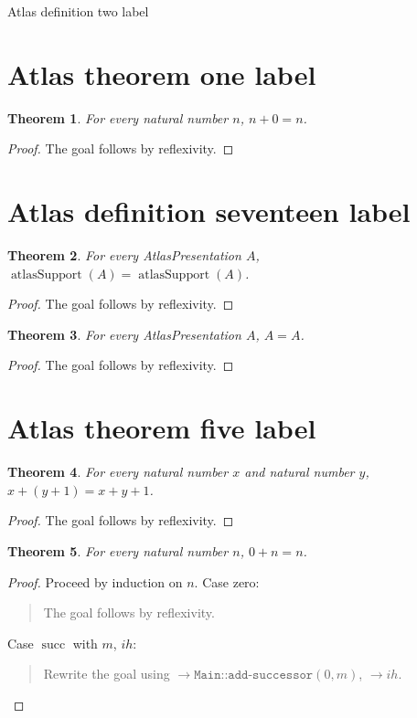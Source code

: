 \documentclass[11pt]{article}
\newtheorem{theorem}{Theorem}[section]
\theoremstyle{definition}
\begin{document}
\begin{center}
{\LARGE Atlas definition two label}
\end{center}
\section{Atlas theorem one label}
\label{ll:main:header}
\begin{theorem}
\label{ll:main:dimension-is-fixed}
For every natural number \(n\), \(n + 0 = n\).
\end{theorem}
\begin{proof}
The goal follows by reflexivity.
\end{proof}
\section{Atlas definition seventeen label}
\label{ll:main:objects}
\begin{theorem}
\label{ll:main:support-is-a-function}
For every AtlasPresentation \(A\), \(\operatorname{atlasSupport}(A) = \operatorname{atlasSupport}(A)\).
\end{theorem}
\begin{proof}
The goal follows by reflexivity.
\end{proof}
\begin{theorem}
\label{ll:main:presentation-is-a-type}
For every AtlasPresentation \(A\), \(A = A\).
\end{theorem}
\begin{proof}
The goal follows by reflexivity.
\end{proof}
\section{Atlas theorem five label}
\label{ll:main:roots}
\begin{theorem}
\label{ll:main:add-successor}
For every natural number \(x\) and natural number \(y\), \(x + (y + 1) = x + y + 1\).
\end{theorem}
\begin{proof}
The goal follows by reflexivity.
\end{proof}
\begin{theorem}
\label{ll:main:root-count-is-a-constant}
For every natural number \(n\), \(0 + n = n\).
\end{theorem}
\begin{proof}
Proceed by induction on \(n\).
Case zero:
\begin{quote}
The goal follows by reflexivity.
\end{quote}
Case \(\operatorname{succ}\) with \(m\), \(ih\):
\begin{quote}
Rewrite the goal using \(\rightarrow \texttt{Main::add-successor}(0, m)\), \(\rightarrow ih\).
\end{quote}
\end{proof}
\end{document}
